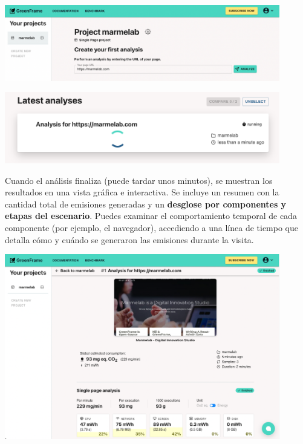 \documentclass[12pt,a4paper]{report}
\begin{document}
\begin{center}
    \includegraphics[width=0.9\textwidth]{imagenes/Greenframe_3.png}
\end{center}

\begin{center}
    \includegraphics[width=0.9\textwidth]{imagenes/Greenframe_4.png}
\end{center}

Cuando el análisis finaliza (puede tardar unos minutos), se muestran los resultados en una vista gráfica e interactiva. Se incluye un resumen con la cantidad total de emisiones generadas y un \textbf{desglose por componentes y etapas del escenario}. Puedes examinar el comportamiento temporal de cada componente (por ejemplo, el navegador), accediendo a una línea de tiempo que detalla cómo y cuándo se generaron las emisiones durante la visita.

\begin{center}
    \includegraphics[width=0.9\textwidth]{imagenes/Greenframe_5.png}
\end{center}
\end{document}
